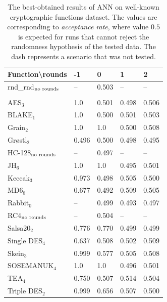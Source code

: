 \documentclass[
    digital,    %
    oneside,    %
    color,
    11pt,
    nocover,
    notable,
    nolof,
    nolot,
]{fithesis3}
\newcommand{\fd}{\cellcolor{red!25}}
\newcommand{\fn}{}
\begin{document}
\begin{table}
\centering
\begin{tabular}{l|l l l l}
\textbf{\large Function\textbackslash{}rounds} & \textbf{\large -1} & \textbf{\large 0} & \textbf{\large 1} & \textbf{\large 2}\\ \hline
rnd\_rnd$_{\textnormal{no rounds}}$& -- & \fn{}0.503 & --         & --         \\\\
AES$_{3}$        & \fd{}1.0   & \fn{}0.501 & \fn{}0.498 & \fn{}0.506 \\
BLAKE$_{1}$      & \fd{}1.0   & \fn{}0.500 & \fn{}0.501 & \fn{}0.503 \\
Grain$_{2}$      & \fd{}1.0   & \fd{}1.0   & \fn{}0.500 & \fn{}0.508 \\
Gr\o stl$_{2}$   & \fn{}0.496 & \fn{}0.500 & \fn{}0.498 & \fn{}0.495 \\
HC-128$_{\textnormal{no rounds}}$& --    & \fn{}0.497 & -- & --      \\
JH$_{6}$         & \fd{}1.0   & \fd{}1.0   & \fn{}0.495 & \fn{}0.501 \\
Keccak$_{3}$     & \fd{}0.973 & \fn{}0.498 & \fn{}0.505 & \fn{}0.500 \\
MD6$_{8}$        & \fd{}0.677 & \fn{}0.492 & \fn{}0.509 & \fn{}0.505 \\
Rabbit$_{0}$     &      --    & \fn{}0.499 & \fn{}0.493 & \fn{}0.497 \\
RC4$_{\textnormal{no rounds}}$& --         & \fn{}0.504 & --         & --         \\
Salsa20$_{2}$    & \fd{}0.776 & \fd{}0.770 & \fn{}0.499 & \fn{}0.499 \\
Single DES$_{4}$ & \fn{}0.637 & \fn{}0.508 & \fn{}0.502 & \fn{}0.509 \\
Skein$_{3}$      & \fd{}0.999 & \fd{}0.577 & \fn{}0.505 & \fn{}0.508 \\
SOSEMANUK$_{4}$  & \fd{}1.0   & \fd{}1.0   & \fn{}0.496 & \fn{}0.501 \\
TEA$_{4}$        & \fd{}0.750 & \fn{}0.507 & \fn{}0.514 & \fn{}0.504 \\
Triple DES$_{2}$ & \fd{}0.999 & \fd{}0.656 & \fn{}0.507 & \fn{}0.500
\end{tabular}
\caption{The best-obtained results of ANN on well-known cryptographic functions dataset. The values are corresponding to \textit{acceptance rate}, where value $0.5$ is expected for runs that cannot reject the randomness hypothesis of the tested data. The dash represents a scenario that was not tested.}
\label{table:res-usable-ann}
\end{table}
\end{document}
